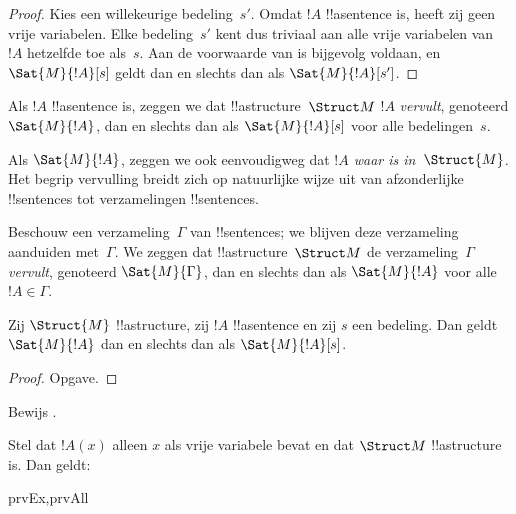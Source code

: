 \documentclass[../../../include/open-logic-section]{subfiles}
\begin{document}
\begin{proof}
  Kies een willekeurige bedeling~$s'$. Omdat $!A$ !!a{sentence} is,
  heeft zij geen vrije variabelen. Elke bedeling~$s'$ kent dus triviaal
  aan alle vrije variabelen van~$!A$ hetzelfde toe als~$s$. Aan de
  voorwaarde van  is bijgevolg voldaan, en
  $\Sat{M}{!A}[s]$ geldt dan en slechts dan als
  $\Sat{M}{!A}[s']$.
\end{proof}

\begin{defn}
Als $!A$ !!a{sentence} is, zeggen we dat !!a{structure}~$\Struct M$
$!A$ \emph{vervult}, genoteerd $\Sat{M}{!A}$, dan en slechts dan als
$\Sat{M}{!A}[s]$ voor alle bedelingen~$s$.
\end{defn}

Als $\Sat{M}{!A}$, zeggen we ook eenvoudigweg dat \emph{$!A$ waar is
in~$\Struct{M}$.} Het begrip vervulling breidt zich op natuurlijke
wijze uit van afzonderlijke !!{sentence}s tot verzamelingen
!!{sentence}s.

\begin{defn}
Beschouw een verzameling~$\Gamma$ van !!{sentence}s; we blijven deze
verzameling aanduiden met~$\Gamma$. We zeggen dat
!!a{structure}~$\Struct M$ de verzameling~$\Gamma$ \emph{vervult},
genoteerd $\Sat{M}{\Gamma}$, dan en slechts dan als
$\Sat{M}{!A}$ voor alle $!A \in \Gamma$.
\end{defn}

\begin{prop}
  Zij $\Struct{M}$ !!a{structure}, zij $!A$ !!a{sentence} en zij $s$
  een bedeling. Dan geldt $\Sat{M}{!A}$ dan en slechts dan als
  $\Sat{M}{!A}[s]$.
\end{prop}

\begin{proof}
Opgave.
\end{proof}

\begin{prob}
Bewijs .
\end{prob}

\begin{prop}
  Stel dat $!A(x)$ alleen $x$ als vrije variabele bevat en dat
  $\Struct M$ !!a{structure} is. Dan geldt:
  \begin{tagenumerate}{prvEx,prvAll}
\end{tagenumerate}
\end{prop}
\end{document}

